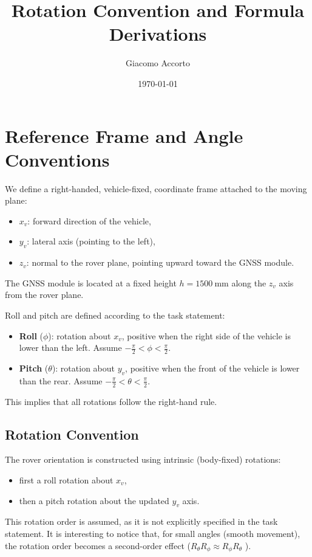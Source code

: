 \documentclass{article}
\title{Rotation Convention and Formula Derivations}
\author{Giacomo Accorto}
\date{\today}
\begin{document}
\maketitle

\section{Reference Frame and Angle Conventions}

We define a right-handed, vehicle-fixed, coordinate frame attached to the moving plane:
\begin{itemize}
  \item $x_v$: forward direction of the vehicle,
  \item $y_v$: lateral axis (pointing to the left),
  \item $z_v$: normal to the rover plane, pointing upward toward the GNSS module.
\end{itemize}

The GNSS module is located at a fixed height $h = 1500\ \text{mm}$ along the $z_v$ axis
from the rover plane.

Roll and pitch are defined according to the task statement:
\begin{itemize}
  \item \textbf{Roll} ($\phi$): rotation about $x_v$, positive when the right side of
  the vehicle is lower than the left. Assume
  $-\frac{\pi}{2} < \phi < \frac{\pi}{2}$.
  \item \textbf{Pitch} ($\theta$): rotation about $y_v$, positive when the front of the
  vehicle is lower than the rear. Assume
  $-\frac{\pi}{2} < \theta < \frac{\pi}{2}$.
\end{itemize}
This implies that all rotations follow the right-hand rule.

\subsection{Rotation Convention}

The rover orientation is constructed using intrinsic (body-fixed) rotations:
\begin{itemize}
  \item first a roll rotation about $x_v$,
  \item then a pitch rotation about the updated $y_v$ axis.
\end{itemize}

This rotation order is assumed, as it is not explicitly specified in the task statement.
It is interesting to notice that, for small angles (smooth movement), the rotation order
becomes a second-order effect ($R_\theta R_\phi \approx R_\phi R_\theta$ ).
\end{document}
